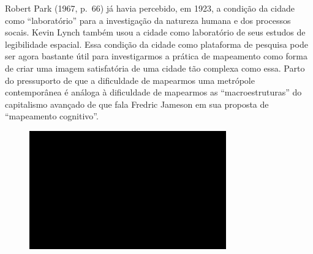 Robert Park (1967, p.~66) já havia percebido, em 1923, a condição da
cidade como ``laboratório'' para a investigação da natureza humana e dos
processos socais. Kevin Lynch também usou a cidade como laboratório de
seus estudos de legibilidade espacial. Essa condição da cidade como
plataforma de pesquisa pode ser agora bastante útil para investigarmos a
prática de mapeamento como forma de criar uma imagem satisfatória de uma
cidade tão complexa como essa. Parto do pressuporto de que a dificuldade
de mapearmos uma metrópole contemporânea é análoga à dificuldade de
mapearmos as ``macroestruturas'' do capitalismo avançado de que fala
Fredric Jameson em sua proposta de ``mapeamento cognitivo''.

\begin{figure}[!ht]
\centering
 \includegraphics[width=85mm]{./imgs/im1.jpg}
\caption{\tiny{}}
\end{figure}

